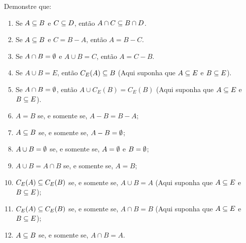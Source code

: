 \documentclass[12pt]{article}
\begin{document}
\questao Demonstre que:
\begin{enumerate}[label={\alph*})]
\item Se $A \subseteq B$ e $C \subseteq D$, ent{\~a}o $A \cap C \subseteq B \cap D$.

\item Se $A \subseteq B$ e $C = B - A$, ent{\~a}o $A = B - C$.

\item Se $A \cap B = \emptyset$ e $A \cup B = C$, ent{\~a}o $A = C - B$.

\item Se $A\cup B = E$, ent{\~a}o $C_E(A) \subseteq B$ (Aqui suponha que $A \subseteq E$ e $B \subseteq E$).

\item Se $A \cap B = \emptyset$, ent{\~a}o $A \cup C_E(B) = C_E(B)$ (Aqui suponha que $A \subseteq E$ e $B \subseteq E$).
  
\item $A = B$ se, e somente se, $A - B = B - A$;

\item $A \subseteq B$ se, e somente se, $A - B = \emptyset$;

\item $A \cup B = \emptyset$ se, e somente se, $A = \emptyset$ e $B = \emptyset$;

\item $A \cup B = A \cap B$ se, e somente se,  $A = B$;

\item $C_E(A) \subseteq C_E(B)$ se, e somente se, $A \cup B = A$ (Aqui suponha que $A \subseteq E$ e $B \subseteq E$);

\item $C_E(A) \subseteq C_E(B)$ se, e somente se, $A \cap B = B$ (Aqui suponha que $A \subseteq E$ e $B \subseteq E$);

\item $A \subseteq B$ se, e somente se,  $A \cap B = A$.
\end{enumerate}

\vspace{.3cm}
\end{document}
